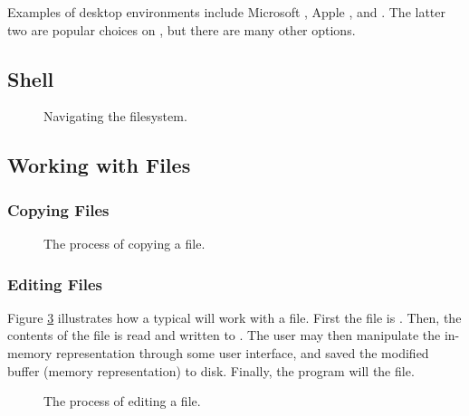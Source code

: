 Examples of desktop environments include Microsoft , Apple ,  and . The latter two are popular choices on , but there are many other options.

\subsection{Shell}

\begin{figure}[tbp]
  
  \caption{Navigating the filesystem.}
  \label{fig:bg:processes:navigation}
\end{figure}

\subsection{Working with Files}

\subsubsection{Copying Files}



\begin{figure}[tbp]
  
  \caption{The process of copying a file.}
  \label{fig:bg:processes:copy}
\end{figure}

\subsubsection{Editing Files}


Figure \ref{fig:bg:processes:edit} illustrates how a typical  will work with a file. First the file is . Then, the contents of the file is read and written to . The user may then manipulate the in-memory representation through some user interface, and saved the modified buffer (memory representation) to disk. Finally, the program will  the file.

\begin{figure}[tbp]
  
  \caption{The process of editing a file.}
  \label{fig:bg:processes:edit}
\end{figure}

